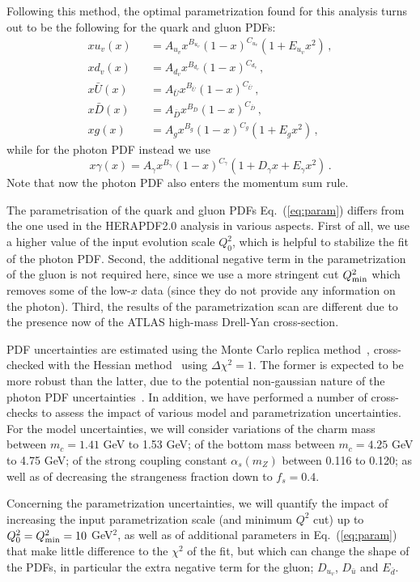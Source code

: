 Following this method, the optimal parametrization found for this analysis turns
out to be the following for the quark and gluon PDFs:
\begin{eqnarray}
  \nonumber
  xu_v(x) &&= A_{u_v}x^{B_{u_v}}(1-x)^{C_{u_v}}(1+E_{u_v}x^{2})\, , \\
  \nonumber
xd_v(x) &&= A_{d_v}x^{B_{d_v}}(1-x)^{C_{d_v}}\, , \\
x\bar{U}(x) &&= A_{\bar{U}}x^{B_{\bar{U}}}(1-x)^{C_{\bar{U}}}\, , \\
\nonumber
x\bar{D}(x) &&= A_{\bar{D}}x^{B_{\bar{D}}}(1-x)^{C_{\bar{D}}}\, , \\
\nonumber
\label{eq:param}
xg(x) &&= A_{g}x^{B_{g}}(1-x)^{C_{g}}(1+E_{g}x^{2})\, ,
\end{eqnarray}
while for the photon PDF instead we use
\begin{equation}
x\gamma(x) = A_{\gamma}x^{B_{\gamma}}(1-x)^{C_{\gamma}}(1+D_{\gamma}x+E_{\gamma}x^{2}) \, .
\end{equation}
Note that now the photon PDF also enters the momentum sum rule.

The parametrisation of the quark and gluon PDFs Eq.~(\ref{eq:param}) differs from the one used
in the HERAPDF2.0 analysis in various aspects.
%
First of all, we use a higher value of the input evolution scale $Q^2_0$, which is helpful
to stabilize the fit of the photon PDF.
%
Second, the additional negative term in the parametrization of the gluon
is not required here, since we use a more stringent cut $Q_{\rm min}^2$ which removes
some of the low-$x$ data (since they do not provide any information on the photon).
%
Third, the results of the parametrization scan are different due to the presence now
of the ATLAS high-mass Drell-Yan cross-section.

PDF uncertainties are estimated using the Monte Carlo
replica method~\cite{DelDebbio:2004xtd}, cross-checked
with the Hessian method~\cite{Pumplin:2001ct} using $\Delta\chi^2=1$.
%
The former is expected to be more robust than the latter, due to the potential
non-gaussian nature of the photon PDF uncertainties~\cite{Ball:2013hta}.
%
In addition, we have performed a number of cross-checks to assess the impact
of various model and parametrization uncertainties.
%
For the model uncertainties, we will consider variations of the charm mass
between $m_c=1.41$ GeV to 1.53 GeV; of the bottom mass between
$m_c=4.25$ GeV to 4.75 GeV; of the strong
coupling constant $\alpha_s(m_Z)$ between 0.116 to 0.120; as well
as of decreasing the strangeness fraction down to  $f_s=0.4$.


Concerning the parametrization uncertainties, we will quantify the impact of
 increasing the input parametrization scale
 (and minimum $Q^2$ cut) up to $Q_0^2=Q^2_{\rm min}=10$ GeV$^2$, as well as
 of additional parameters in Eq.~(\ref{eq:param}) that make little difference to the $\chi^2$ of the fit, but which can change the shape of the PDFs, in particular the extra negative term for the gluon; $D_{u_v}$, $D_{\bar{u}}$ and $E_{\bar{d}}$.
